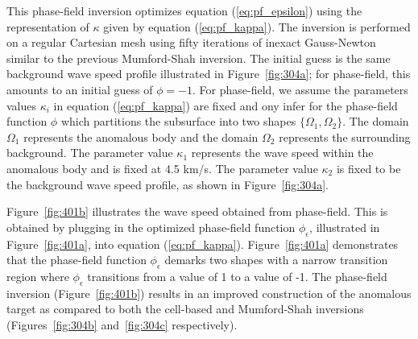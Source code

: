 \documentclass[manuscript,revised]{geophysics}
\begin{document}
This phase-field inversion optimizes equation (\ref{eq:pf_epsilon}) using the representation of $\kappa$ given by equation (\ref{eq:pf_kappa}). The inversion is performed on a regular Cartesian mesh using fifty iterations of inexact Gauss-Newton similar to the previous Mumford-Shah inversion. The initial guess is the same background wave speed profile illustrated in Figure~\ref{fig:304a}; for phase-field, this amounts to an initial guess of $\phi=-1$.  For phase-field, we assume the parameters values $\kappa_i$ in equation (\ref{eq:pf_kappa}) are fixed and ony infer for the phase-field function $\phi$ which partitions the subsurface into two shapes $\{\Omega_1,\Omega_2 \}$. The domain $\Omega_1$ represents the anomalous body and the domain $\Omega_2$ represents the surrounding background. The parameter value $\kappa_1$ represents the wave speed within the anomalous body and is fixed at 4.5 km/s. The parameter value $\kappa_2$ is fixed to be the background wave speed profile, as shown in Figure~\ref{fig:304a}.

Figure~\ref{fig:401b} illustrates the wave speed obtained from phase-field.  This is obtained by plugging in the optimized phase-field function $\phi_\epsilon$, illustrated in Figure~\ref{fig:401a}, into equation (\ref{eq:pf_kappa}).  Figure~\ref{fig:401a} demonstrates that the phase-field function $\phi_\epsilon$ demarks two shapes with a narrow transition region where $\phi_\epsilon$ transitions from a value of 1 to a value of -1. The phase-field inversion (Figure~\ref{fig:401b}) results in an improved construction of the anomalous target as compared to both the cell-based and Mumford-Shah inversions (Figures~\ref{fig:304b} and~\ref{fig:304c} respectively).
\end{document}
